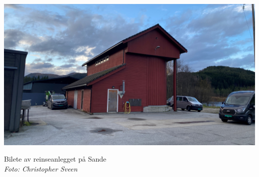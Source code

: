 \chapter*{}
\thispagestyle{romanpages}

\noindent\begin{adjustbox}{center=\paperwidth}
	\hspace*{-0.25\textwidth} %
    \includegraphics[width=1.1\textwidth]{Bilder/Framside RA200.jpg}
\end{adjustbox}

\begin{center}
    Bilete av reinseanlegget på Sande \\
    \textit{Foto: Christopher Sveen}
\end{center}
